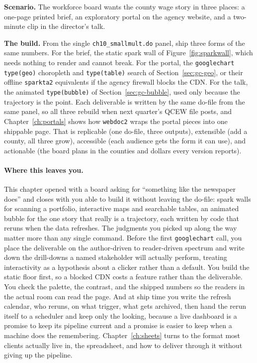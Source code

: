 \documentclass[
    a4paper,
    fontsize=10pt,
    twoside=true,
    numbers=noenddot,
]{kaobook}
\newcounter{appliedexample}
\newenvironment{appliedexample}[1][]{%
    \refstepcounter{appliedexample}%
    \begin{appliedexamplebox}[frametitle={Applied Example~\theappliedexample.~~#1}]%
}{%
    \end{appliedexamplebox}%
}
\begin{document}
\begin{appliedexample}[One dataset, three deliverables]\label{ae:ch10-threedeliv}
\textbf{Scenario.} The workforce board wants the county wage story in three places: a one-page printed brief, an exploratory portal on the agency website, and a two-minute clip in the director's talk.

\medskip
\textbf{The build.} From the single \texttt{ch10\_smallmult.do} panel, ship three forms of the same numbers. For the brief, the static spark wall of Figure~\ref{fig:sparkwall}, which needs nothing to render and cannot break. For the portal, the \texttt{googlechart type(geo)} choropleth and \texttt{type(table)} search of Section~\ref{sec:gc-geo}, or their offline \texttt{sparkta2} equivalents if the agency firewall blocks the CDN. For the talk, the animated \texttt{type(bubble)} of Section~\ref{sec:gc-bubble}, used only because the trajectory is the point. Each deliverable is written by the same do-file from the same panel, so all three rebuild when next quarter's QCEW file posts, and Chapter~\ref{ch:portals} shows how \texttt{webdoc2} wraps the portal pieces into one shippable page. That is replicable (one do-file, three outputs), extensible (add a county, all three grow), accessible (each audience gets the form it can use), and actionable (the board plans in the counties and dollars every version reports).
\end{appliedexample}

\paragraph{Where this leaves you.} This chapter opened with a board asking for \enquote{something like the newspaper does} and closes with you able to build it without leaving the do-file: spark walls for scanning a portfolio, interactive maps and searchable tables, an animated bubble for the one story that really is a trajectory, each written by code that reruns when the data refreshes. The judgments you picked up along the way matter more than any single command. Before the first \texttt{googlechart} call, you place the deliverable on the author-driven to reader-driven spectrum and write down the drill-downs a named stakeholder will actually perform, treating interactivity as a hypothesis about a clicker rather than a default. You build the static floor first, so a blocked CDN costs a feature rather than the deliverable. You check the palette, the contrast, and the shipped numbers so the readers in the actual room can read the page. And at ship time you write the refresh calendar, who reruns, on what trigger, what gets archived, then hand the rerun itself to a scheduler and keep only the looking, because a live dashboard is a promise to keep its pipeline current and a promise is easier to keep when a machine does the remembering. Chapter~\ref{ch:sheets} turns to the format most clients actually live in, the spreadsheet, and how to deliver through it without giving up the pipeline.
\end{document}

